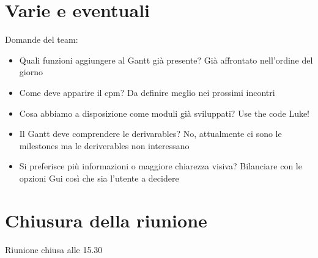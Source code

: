 \newpage
\section*{Varie e eventuali}
Domande del team:
\begin{itemize}
\item Quali funzioni aggiungere al Gantt gi\`a presente?
Gi\`a affrontato nell'ordine del giorno
\item Come deve apparire il cpm?
Da definire meglio nei prossimi incontri
\item Cosa abbiamo a disposizione come moduli gi\`a sviluppati?
Use the code Luke!
\item Il Gantt deve comprendere le derivarables?
No, attualmente ci sono le milestones ma le deriverables non interessano
\item Si preferisce pi\`u informazioni o maggiore chiarezza visiva?
Bilanciare con le opzioni Gui cos\`i che sia l'utente a decidere
\end{itemize}

\section*{Chiusura della riunione}
Riunione chiusa alle 15.30
